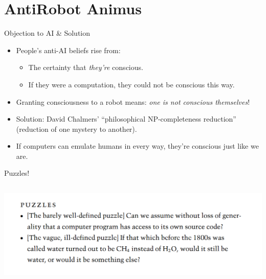\documentclass[
    11pt, %
    aspectratio=169, %
]{beamer}
\begin{document}
\section{AntiRobot Animus}
\begin{frame}{Objection to AI \& Solution}
    \begin{itemize}
        \item People's anti-AI beliefs rise from:
        \begin{itemize}
            \item The certainty that \textit{they're} conscious.
            \item If they were a computation, they could not be conscious this way.
        \end{itemize}
        \item Granting consciousness to a robot means: \textit{one is not conscious themselves}!
        \item Solution: David Chalmers' “philosophical NP-completeness reduction” (reduction of one mystery to another).
        \item If computers can emulate humans in every way, they're conscious just like we are.
    \end{itemize}
\end{frame}

\begin{frame}{Puzzles!}
\subtitle{And solution to previous puzzles in book!}
    \centering
    \includegraphics[angle=0, width=14cm, height=5cm]{puzzles4.png}
\end{frame}
\end{document}
